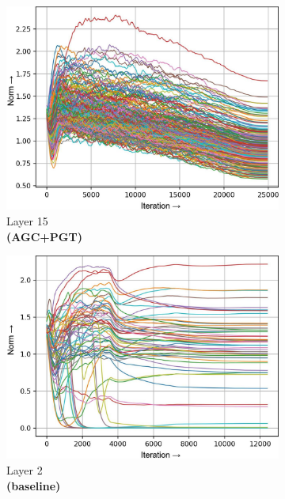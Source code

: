 \documentclass[runningheads]{llncs}
\begin{document}
\begin{figure}[t]
\begin{subfigure}[t]{0.16\textwidth}
\includegraphics[width=\textwidth]{trimmed/agc_pgt-w-layer-5-3}
\caption{Layer 15\\ \textbf{(AGC+PGT)}}
\end{subfigure}
\begin{subfigure}[t]{0.16\textwidth}
\includegraphics[width=\textwidth]{trimmed/baseline-w-layer-1-2}
\caption{Layer 2\\ \textbf{(baseline)}
}\end{subfigure}
\begin{subfigure}[t]{0.16\textwidth}

\end{subfigure}
\end{figure}
\end{document}
